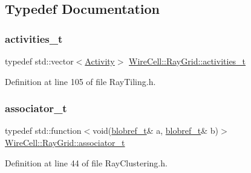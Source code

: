 \subsection{Typedef Documentation}
\mbox{\label{namespace_wire_cell_1_1_ray_grid_af748d1ae6bed1a329eb9f14dd11e2873}} 
\subsubsection{\texorpdfstring{activities\+\_\+t}{activities\_t}}
{\footnotesize\ttfamily typedef std\+::vector$<$\hyperlink{class_wire_cell_1_1_ray_grid_1_1_activity}{Activity}$>$ \hyperlink{namespace_wire_cell_1_1_ray_grid_af748d1ae6bed1a329eb9f14dd11e2873}{Wire\+Cell\+::\+Ray\+Grid\+::activities\+\_\+t}}



Definition at line 105 of file Ray\+Tiling.\+h.

\mbox{\label{namespace_wire_cell_1_1_ray_grid_a7441e06379a2aef6996c5fae438b797a}} 
\subsubsection{\texorpdfstring{associator\+\_\+t}{associator\_t}}
{\footnotesize\ttfamily typedef std\+::function$<$void(\hyperlink{namespace_wire_cell_1_1_ray_grid_abed76699c704f53d6c4ce912da18050b}{blobref\+\_\+t}\& a, \hyperlink{namespace_wire_cell_1_1_ray_grid_abed76699c704f53d6c4ce912da18050b}{blobref\+\_\+t}\& b)$>$ \hyperlink{namespace_wire_cell_1_1_ray_grid_a7441e06379a2aef6996c5fae438b797a}{Wire\+Cell\+::\+Ray\+Grid\+::associator\+\_\+t}}



Definition at line 44 of file Ray\+Clustering.\+h.

\mbox{\label{namespace_wire_cell_1_1_ray_grid_a2495e73e12fdf4e81ffef9d99f8a8e22}} 
